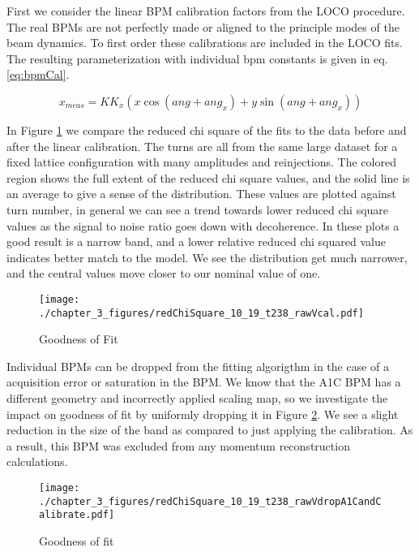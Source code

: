 First we consider the linear BPM calibration factors from the LOCO procedure. The real BPMs are not perfectly made or aligned to the principle modes of the beam dynamics. To first order these calibrations are included in the LOCO fits. The resulting parameterization with individual bpm constants is given in eq. \ref{eq:bpmCal}.

\begin{equation}
	x_{meas} = K K_{x} \left( x \cos(ang + ang_{x}) + y \sin(ang + ang_{x})\right)
	\label{eq:bpmCal}
\end{equation}

In Figure \ref{fig:rawVcal} we compare the reduced chi square of the fits to the data before and after the linear calibration. The turns are all from the same large dataset for a fixed lattice configuration with many amplitudes and reinjections. The colored region shows the full extent of the reduced chi square values, and the solid line is an average to give a sense of the distribution. These values are plotted against turn number, in general we can see a trend towards lower reduced chi square values as the signal to noise ratio goes down with decoherence. In these plots a good result is a narrow band, and a lower relative reduced chi squared value indicates better match to the model. We see the distribution get much narrower, and the central values move closer to our nominal value of one.

\begin{figure}
    \centering
    \texttt{[image: ./chapter\_3\_figures/redChiSquare\_10\_19\_t238\_rawVcal.pdf]}
    \caption{Goodness of Fit}
    \label{fig:rawVcal}
\end{figure}

Individual BPMs can be dropped from the fitting algorigthm in the case of a acquisition error or saturation in the BPM. We know that the A1C BPM has a different geometry and incorrectly applied scaling map, so we investigate the impact on goodness of fit by uniformly dropping it in Figure \ref{fig:rawVA1C}. We see a slight reduction in the size of the band as compared to just applying the calibration. As a result, this BPM was excluded from any momentum reconstruction calculations.

\begin{figure}
    \centering
    \texttt{[image: ./chapter\_3\_figures/redChiSquare\_10\_19\_t238\_rawVdropA1CandCalibrate.pdf]}
    \caption{Goodness of fit}
    \label{fig:rawVA1C}
\end{figure}

